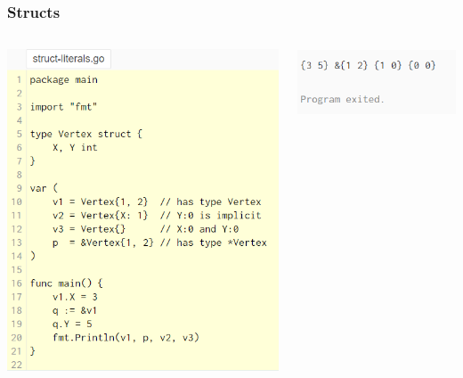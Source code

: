 \documentclass[14pt]{beamer}
\begin{document}
{
\begin{frame}
    \frametitle{Structs}
    \begin{columns}
        \begin{column}{0.6\textwidth}
            \includegraphics[width=0.9\linewidth]{img/struct.PNG}
        \end{column}
        \begin{column}{0.4\textwidth}
            \includegraphics[width=\linewidth]{img/structoutput.PNG}
        \end{column}
    \end{columns}
\end{frame}
}
\end{document}
